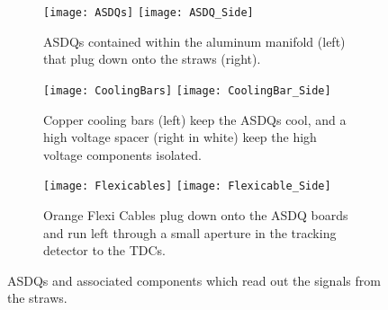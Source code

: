 \begin{figure}
\centering
    \begin{subfigure}[t]{1\textwidth}
    \centering
        \texttt{[image: ASDQs]}
    \hspace{1mm}
        \texttt{[image: ASDQ\_Side]}
    \caption{ASDQs contained within the aluminum manifold (left) that plug down onto the straws (right).}
    \label{fig:ASDQs}
    \end{subfigure}
    \begin{subfigure}[t]{1\textwidth}
    \centering
        \texttt{[image: CoolingBars]}
    \hspace{1mm}
        \texttt{[image: CoolingBar\_Side]}
    \caption{Copper cooling bars (left) keep the ASDQs cool, and a high voltage spacer (right in white) keep the high voltage components isolated.}
    \end{subfigure}
    \begin{subfigure}[t]{1\textwidth}
    \centering
        \texttt{[image: Flexicables]}
    \hspace{1mm}
        \texttt{[image: Flexicable\_Side]}
    \caption{Orange Flexi Cables plug down onto the ASDQ boards and run left through a small aperture in the tracking detector to the TDCs.}
    \label{fig:flexis}
    \end{subfigure}
\caption[Tracker ASDQs and associated components]{ASDQs and associated components which read out the signals from the straws.}
\end{figure}





